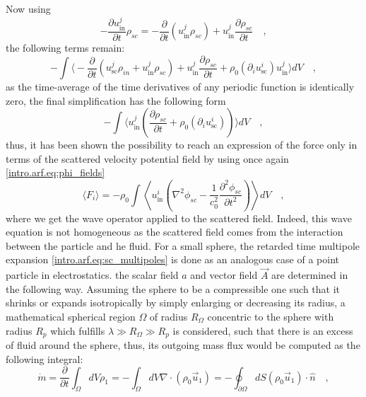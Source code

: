 Now using 
\begin{equation}
    -\frac{\partial u_{\text{in}}^{j}}{\partial t}\rho_{sc} = -\frac{\partial}{\partial t}(u_{\text{in}}^{j}\rho_{sc}) + u_{\text{in}}^{j}\frac{\partial \rho_{sc}}{\partial t}\quad,
\end{equation}
the following terms remain:
\begin{equation}
    -\int\bigg\langle-\frac{\partial}{\partial t}(u_{\text{sc}}^{j}\rho_{in} + u_{\text{in}}^{j}\rho_{sc}) + u_{\text{in}}^{j}\frac{\partial \rho_{sc}}{\partial t} + \rho_0(\partial_{i}u_{\text{sc}}^{i})u_{\text{in}}^{j}\bigg\rangle dV\quad,
\end{equation}
as the time-average of the time derivatives of any periodic function is identically zero, the final simplification has the following form
\begin{equation}
    -\int\bigg\langle u_{\text{in}}^{j}\left(\frac{\partial \rho_{sc}}{\partial t} + \rho_0(\partial_{i}u_{\text{sc}}^{i})\right)\bigg\rangle dV\quad,
\end{equation}
thus, it has been shown the possibility to reach an expression of the force only in terms of the scattered velocity potential field by using once again \eqref{intro.arf.eq:phi_fields}
\begin{equation}\label{intro.arf.eq:F_sc}
    \langle F_{i} \rangle = - \rho_0\int \left\langle u_{\text{in}}^i\left(\nabla^2\phi_{sc}-\frac{1}{c_0^2}\frac{\partial^2\phi_{sc}}{\partial  t^2}\right)\right\rangle dV\quad,
\end{equation}
where we get the wave operator applied to the scattered field. Indeed, this wave equation is not homogeneous as the scattered field comes from the interaction between the particle and he fluid. For a small sphere, the retarded time multipole expansion \eqref{intro.arf.eq:sc_multipoles} is done as an analogous case of a point particle in electrostatics. the scalar field $a$ and vector field $\vec A$ are determined in the following way. Assuming the sphere to be a compressible one such that it shrinks or expands isotropically by simply enlarging or decreasing its radius, a mathematical spherical region $\Omega$ of radius $R_{\Omega}$ concentric to the sphere with radius $R_p$ which fulfills $\lambda\gg R_{\Omega}\gg R_p$ is considered, such that there is an excess of fluid around the sphere, thus, its outgoing mass flux would be computed as the following integral: 
\begin{equation}
    \dot m = \frac{\partial}{\partial t}\int_{\Omega}dV \rho_1 = -\int_\Omega dV \nabla\cdot(\rho_0\vec u_1) = -\oint_{\partial\Omega} dS (\rho_0\vec u_1)\cdot\hat n\quad,
\end{equation}
